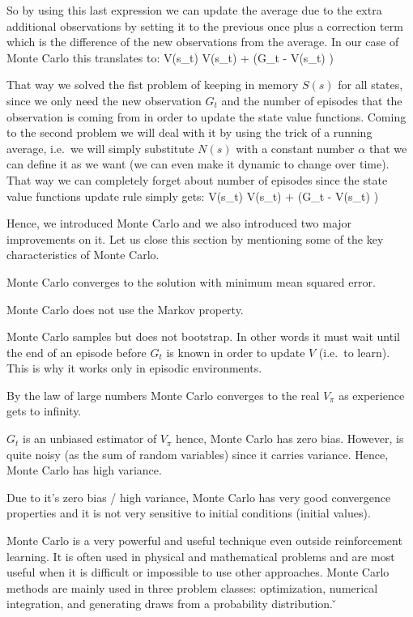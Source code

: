 \vspace{-5pt}

So by using this last expression we can update the average due to the extra additional observations by setting it to
the previous once plus a correction term which is the difference of the new observations from the average. In our
case of Monte Carlo this translates to:
\bse
V(s_t) \gets V(s_t) +  \left(G_t - V(s_t) \right)
\ese

That way we solved the fist problem of keeping in memory $S(s)$ for all states, since we only need the new
observation $G_t$ and the number of episodes that the observation is coming from in order to update the state value
functions. Coming to the second problem we will deal with it by using the trick of a running average, i.e.\ we will
simply substitute $N(s)$ with a constant number $\alpha$ that we can define it as we want (we can even make it
dynamic to change over time). That way we can completely forget about number of episodes since the state value
functions update rule simply gets:
\bse
V(s_t) \gets V(s_t) + \alpha \left(G_t - V(s_t) \right)
\ese

Hence, we introduced Monte Carlo and we also introduced two major improvements on it. Let us close this section by
mentioning some of the key characteristics of Monte Carlo.
\bit
\item Monte Carlo converges to the solution with minimum mean squared error.
\item Monte Carlo does not use the Markov property.
\item Monte Carlo samples but does not bootstrap. In other words it must wait until the end of an episode before
$G_t$ is known in order to update $V$ (i.e.\ to learn). This is why it works only in episodic environments.
\item By the law of large numbers Monte Carlo converges to the real $V_\pi$ as experience gets to infinity.
\item $G_t$ is an unbiased estimator of $V_\pi$ hence, Monte Carlo has zero bias. However, is quite noisy (as the sum
of random variables) since it carries variance. Hence, Monte Carlo has high variance.
\item Due to it's zero bias / high variance, Monte Carlo has very good convergence properties and it is not very
sensitive to initial conditions (initial values).
\eit

Monte Carlo is a very powerful and useful technique even outside reinforcement learning. It is often used in physical
and mathematical problems and are most useful when it is difficult or impossible to use other approaches. Monte Carlo
methods are mainly used in three problem classes: optimization, numerical integration, and generating draws from a
probability distribution. \v

